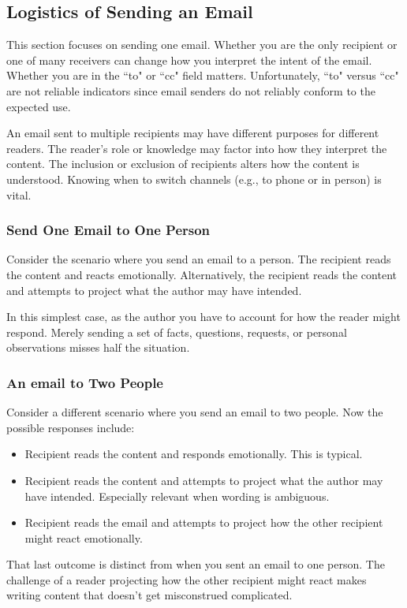 
\subsection*{Logistics of Sending an Email\label{sec:sending_email}}


This section focuses on sending one email. Whether you are the only recipient or one of many receivers can change how you interpret the intent of the email. Whether you are in the ``to" or ``cc" field matters. Unfortunately, ``to" versus ``cc" are not reliable indicators since email senders do not reliably conform to the expected use. 


An email sent to multiple recipients may have different purposes for different readers. The reader's role or knowledge may factor into how they interpret the content. The inclusion or exclusion of recipients alters how the content is understood.  Knowing when to switch channels (e.g., to phone or in person) is vital.

\subsubsection*{Send One Email to One Person}

Consider the scenario where you send an email to a person. 
The recipient reads the content and reacts emotionally.
Alternatively, the recipient reads the content and attempts to project what the author may have intended.

In this simplest case, as the author you have to account for how the reader might respond. Merely sending a set of facts, questions, requests, or personal observations misses half the situation.


\subsubsection*{An email to Two People}
Consider a different scenario where you send an email to two people. Now the possible responses include:
\begin{itemize}
\item Recipient reads the content and responds emotionally. This is typical.
\item Recipient reads the content and attempts to project what the author may have intended. Especially relevant when wording is ambiguous.
\item Recipient reads the email and attempts to project how the other recipient might react emotionally.
\end{itemize}
That last outcome is distinct from when you sent an email to one person. The challenge of a reader projecting how the other recipient might react makes writing content that doesn't get misconstrued complicated. 

